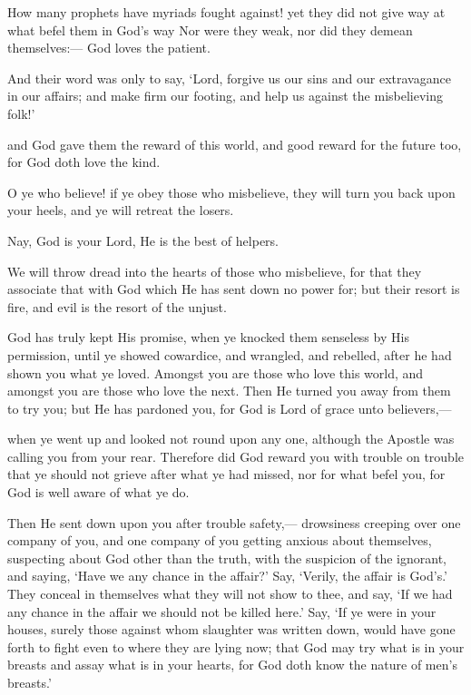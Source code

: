 \documentclass[fontsize=14pt, letterpaper, notitlepage, openany, DIV=12]{scrbook} %
\begin{document}
\noindent[3:146]
How many prophets have myriads fought against! yet they did not give way at what befel
them in God's way Nor were they weak, nor did they demean themselves:--- God loves the
patient.

\noindent[3:147]
And their word was only to say, `Lord, forgive us our sins and our extravagance in our
affairs; and make firm our footing, and help us against the misbelieving folk!'

\noindent[3:148]
and God gave them the reward of this world, and good reward for the future too, for God
doth love the kind.

\noindent[3:149]
O ye who believe! if ye obey those who misbelieve, they will turn you back upon your
heels, and ye will retreat the losers.

\noindent[3:150]
Nay, God is your Lord, He is the best of helpers.

\noindent[3:151]
We will throw dread into the hearts of those who misbelieve, for that they associate that
with God which He has sent down no power for; but their resort is fire, and evil is the resort of
the unjust.

\noindent[3:152]
God has truly kept His promise, when ye knocked them senseless by His permission,
until ye showed cowardice, and wrangled, and rebelled, after he had shown you what ye loved.
Amongst you are those who love this world, and amongst you are those who love the next. Then
He turned you away from them to try you; but He has pardoned you, for God is Lord of grace
unto believers,---

\noindent[3:153]
when ye went up and looked not round upon any one, although the Apostle was calling
you from your rear. Therefore did God reward you with trouble on trouble that ye should not
grieve after what ye had missed, nor for what befel you, for God is well aware of what ye do.

\noindent[3:154]
Then He sent down upon you after trouble safety,--- drowsiness creeping over one
company of you, and one company of you getting anxious about themselves, suspecting about
God other than the truth, with the suspicion of the ignorant, and saying, `Have we any chance in
the affair?' Say, `Verily, the affair is God's.' They conceal in themselves what they will not
show to thee, and say, `If we had any chance in the affair we should not be killed here.' Say, `If
ye were in your houses, surely those against whom slaughter was written down, would have gone
forth to fight even to where they are lying now; that God may try what is in your breasts and
assay what is in your hearts, for God doth know the nature of men's breasts.'
\end{document}
